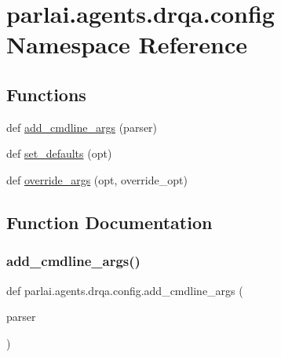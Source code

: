 \hypertarget{namespaceparlai_1_1agents_1_1drqa_1_1config}{}\section{parlai.\+agents.\+drqa.\+config Namespace Reference}
\label{namespaceparlai_1_1agents_1_1drqa_1_1config}
\subsection*{Functions}
\begin{DoxyCompactItemize}
\item 
def \hyperlink{namespaceparlai_1_1agents_1_1drqa_1_1config_a62fdd5554f1da6be0cba185271058320}{add\+\_\+cmdline\+\_\+args} (parser)
\item 
def \hyperlink{namespaceparlai_1_1agents_1_1drqa_1_1config_a8cc825bafeff299794cba6e2a8b65da2}{set\+\_\+defaults} (opt)
\item 
def \hyperlink{namespaceparlai_1_1agents_1_1drqa_1_1config_a0fd9c7cd1129e5b4a7c0315b9f03c31a}{override\+\_\+args} (opt, override\+\_\+opt)
\end{DoxyCompactItemize}


\subsection{Function Documentation}
\mbox{\label{namespaceparlai_1_1agents_1_1drqa_1_1config_a62fdd5554f1da6be0cba185271058320}} 
\subsubsection{\texorpdfstring{add\+\_\+cmdline\+\_\+args()}{add\_cmdline\_args()}}
{\footnotesize\ttfamily def parlai.\+agents.\+drqa.\+config.\+add\+\_\+cmdline\+\_\+args (\begin{DoxyParamCaption}\item[{}]{parser }\end{DoxyParamCaption})}

\mbox{\label{namespaceparlai_1_1agents_1_1drqa_1_1config_a0fd9c7cd1129e5b4a7c0315b9f03c31a}} 
